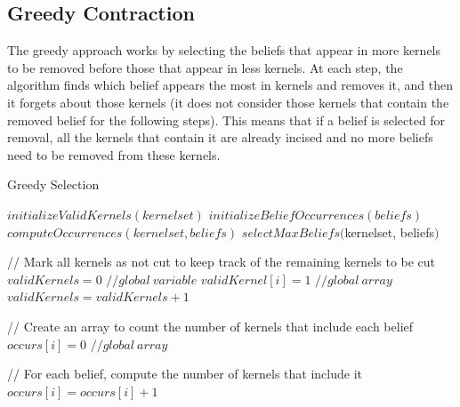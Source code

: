 \subsection{Greedy Contraction}
The greedy approach works by selecting the beliefs that appear in more kernels to be removed before those that appear in less kernels. At each step, the algorithm finds which belief appears the most in kernels and removes it, and then it forgets about those kernels (it does not consider those kernels that contain the removed belief for the following steps). This means that if a belief is selected for removal, all the kernels that contain it are already incised and no more beliefs need to be removed from these kernels.

\begin{algorithm}
\caption{Greedy Selection}
\label{GreedyAlgorithm}
\begin{algorithmic}[1]
\State $initializeValidKernels(kernelset)$
\State $initializeBeliefOccurrences(beliefs)$ 
\State $computeOccurrences(kernelset, beliefs)$ 
\State \Return $selectMaxBeliefs($kernelset, beliefs$)$
\EndFunction
\end{algorithmic}
\end{algorithm}

\begin{algorithm}
\begin{algorithmic}[1]
\State // Mark all kernels as not cut to keep track of the remaining kernels to be cut
\State $validKernels = 0$ $// global \: variable$
\State $validKernel[i] = 1$  $// global \: array$
\State $validKernels = validKernels + 1$
\EndFor
\EndFunction
\end{algorithmic}

\begin{algorithmic}[1]
\State // Create an array to count the number of kernels that include each belief
\State $occurs[i] = 0$  $// global \: array$
\EndFor
\EndFunction
\end{algorithmic}
\end{algorithm}

\begin{algorithm}
\begin{algorithmic}[1]
\State // For each belief, compute the number of kernels that include it
\State $occurs[i] = occurs[i] + 1$
\EndIf
\EndFor
\EndFor
\EndFunction
\end{algorithmic}
\end{algorithm}

